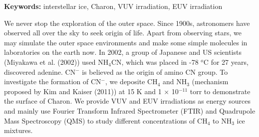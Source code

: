 \begin{abstracten}

{\bf \sf Keywords:} interstellar ice, Charon, VUV irradiation, EUV irradiation

\vspace{2em}

We never stop the exploration of the outer space. Since 1900s, astronomers have observed all over the sky to seek origin of life. Apart from observing stars, we may simulate the outer space environments and make some simple molecules in laboratories on the earth now. In 2002, a group of Japanese and US scientists (Miyakawa et al. (2002)\cite{miyakawa2002cold}) used NH$_4$CN, which was placed in -78 $^o$C for 27 years, discovered adenine. CN$^-$ is believed as the origin of amino CN group. To investigate the formation of CN$^-$, we deposite CH$_4$ and NH$_3$ (mechanism proposed by Kim and Kaiser (2011)\cite{kim}) at 15 K and 1 $\times$ 10$^{-11}$ torr to demonstrate the surface of Charon. We provide VUV and EUV irradiations as energy sources and mainly use Fourier Transform Infrared Spectrometer (FTIR) and Quadrupole Mass Spectroscopy (QMS) to study different concentrations of CH$_4$ to NH$_3$ ice mixtures.

\end{abstracten} 

